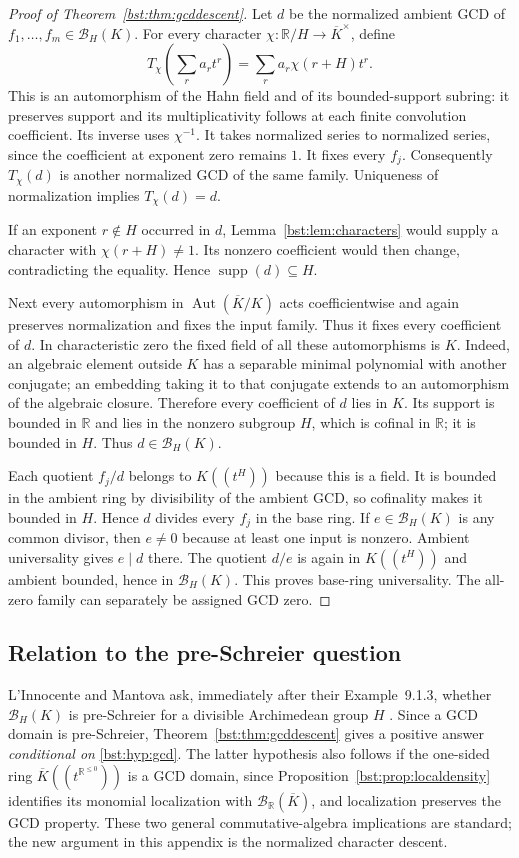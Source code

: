 \documentclass[11pt,letterpaper]{article}
\theoremstyle{definition}
\theoremstyle{remark}
\newcommand{\R}{\mathbb R}
\newcommand{\supp}{\operatorname{supp}}
\newcommand{\Aut}{\operatorname{Aut}}
\newcommand{\HH}[2]{#1((t^{#2}))}
\newcommand{\BB}[2]{\mathcal B_{#2}(#1)}
\begin{document}
\begin{proof}[Proof of Theorem~\ref{bst:thm:gcddescent}]
Let $d$ be the normalized ambient GCD of $f_1,\ldots,f_m\in\BB KH$.
For every character $\chi:\R/H\to\overline K^\times$, define
\[
 T_\chi\left(\sum_r a_rt^r\right)
       =\sum_r a_r\chi(r+H)t^r.
\]
This is an automorphism of the Hahn field and of its bounded-support
subring: it preserves support and its multiplicativity follows at each
finite convolution coefficient. Its inverse uses $\chi^{-1}$. It takes
normalized series to normalized series, since the coefficient at exponent
zero remains $1$. It fixes every $f_j$. Consequently $T_\chi(d)$ is another
normalized GCD of the same family. Uniqueness of normalization implies
$T_\chi(d)=d$.

If an exponent $r\notin H$ occurred in $d$, Lemma~\ref{bst:lem:characters}
would supply a character with $\chi(r+H)\ne1$. Its nonzero coefficient
would then change, contradicting the equality. Hence
$\supp(d)\subseteq H$.

Next every automorphism in $\Aut(\overline K/K)$ acts coefficientwise and
again preserves normalization and fixes the input family. Thus it fixes
every coefficient of $d$. In characteristic zero the fixed field of all
these automorphisms is $K$. Indeed, an algebraic element outside $K$ has
a separable minimal polynomial with another conjugate; an embedding taking
it to that conjugate extends to an automorphism of the algebraic closure.
Therefore every coefficient of $d$ lies in $K$. Its support is bounded in
$\R$ and lies in the nonzero subgroup $H$, which is cofinal in $\R$;
it is bounded in $H$. Thus $d\in\BB KH$.

Each quotient $f_j/d$ belongs to $\HH KH$ because this is a field. It is
bounded in the ambient ring by divisibility of the ambient GCD, so
cofinality makes it bounded in $H$. Hence $d$ divides every $f_j$ in the
base ring. If $e\in\BB KH$ is any common divisor, then $e\ne0$ because at least
one input is nonzero. Ambient universality gives $e\mid d$ there. The quotient $d/e$ is again in $\HH KH$ and ambient
bounded, hence in $\BB KH$. This proves base-ring universality. The
all-zero family can separately be assigned GCD zero.
\end{proof}

\subsection{Relation to the pre-Schreier question}

L'Innocente and Mantova ask, immediately after their Example~9.1.3, whether
$\BB KH$ is pre-Schreier for a divisible Archimedean group $H$
\cite{LM24}. Since a GCD domain is pre-Schreier, Theorem~\ref{bst:thm:gcddescent}
gives a positive answer \emph{conditional on} \eqref{bst:hyp:gcd}.
The latter hypothesis also follows if the one-sided ring
$\overline K((t^{\R^{\le0}}))$ is a GCD domain, since
Proposition~\ref{bst:prop:localdensity} identifies its monomial localization
with $\BB{\overline K}{\R}$, and localization preserves the GCD property.
These two general commutative-algebra implications are standard; the new
argument in this appendix is the normalized character descent.
\end{document}
